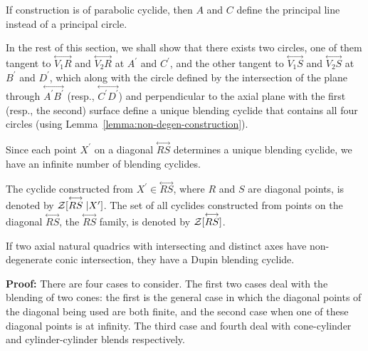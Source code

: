      If construction is of parabolic cyclide, then $A$ and $C$ define the 
principal line instead of a principal circle.

     In the rest of this section, we shall show that there exists two circles, 
one of them tangent to $\stackrel{\longleftrightarrow}{V_1R}$ and
$\stackrel{\longleftrightarrow}{V_2R}$ at $A^\prime$ and $C^\prime$, and the
other tangent to $\stackrel{\longleftrightarrow}{V_1S}$ and
$\stackrel{\longleftrightarrow}{V_2S}$ at $B^\prime$ and $D^\prime$, which
along with the circle defined by the intersection of 
the plane through $\stackrel{\longleftrightarrow}{A^\prime B^\prime}$
(resp., $\stackrel{\longleftrightarrow}{C^\prime D^\prime}$) and
perpendicular to the axial plane with the first (resp., the second) surface
define a unique blending cyclide that contains all four circles
(using Lemma~\ref{lemma:non-degen-construction}).

     Since each point $X^\prime$ on a diagonal 
$\stackrel{\longleftrightarrow}{RS}$ determines a unique blending cyclide, 
we have an infinite number of blending cyclides.  

\begin{definition}
     The cyclide constructed from 
$X^\prime\in\stackrel{\longleftrightarrow}{RS}$, where $R$ and $S$ are diagonal
points, is denoted by 
${\cal Z}[\stackrel{\longleftrightarrow}{RS}|X^\prime]$.
The set of all cyclides constructed from points on the diagonal
$\stackrel{\longleftrightarrow}{RS}$, the 
$\stackrel{\longleftrightarrow}{RS}$ family, is denoted by
${\cal Z}[\stackrel{\longleftrightarrow}{RS}]$.
\end{definition}

\begin{lemma}
\label{lemma:int-cyclide}
     If two axial natural quadrics with intersecting and distinct axes have
non-degenerate conic intersection, they have a Dupin blending cyclide.
\end{lemma}
{\bf Proof:}  There are four cases to consider.  The first two cases deal with
the blending of two cones: the first is the general case in which the diagonal
points of the diagonal being used are both finite, and the second case when
one of these diagonal points is at infinity.  The third case and fourth deal
with cone-cylinder and cylinder-cylinder blends respectively.

